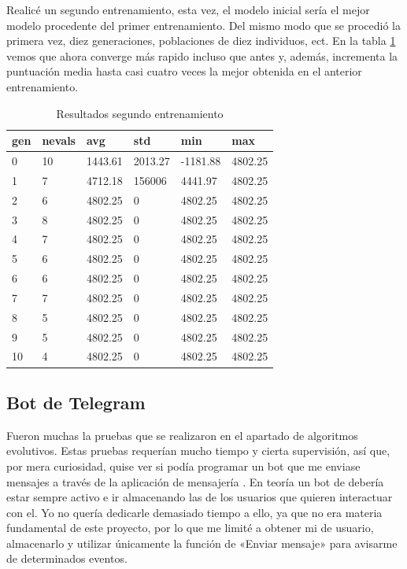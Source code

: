 Realicé un segundo entrenamiento, esta vez, el modelo inicial sería el mejor modelo procedente del primer entrenamiento. Del mismo modo que se procedió la primera vez, diez generaciones, poblaciones de diez individuos, ect. En la tabla \ref{result_segundo_entr} vemos que ahora converge más rapido incluso que antes y, además, incrementa la puntuación media hasta casi cuatro veces la mejor obtenida en el anterior entrenamiento.

\begin{table}[]
\centering
\begin{tabular}{|l|l|l|l|l|l|}
\hline
\rowcolor[HTML]{C0C0C0} 
gen & nevals & avg     & std     & min      & max     \\ \hline
0   & 10     & 1443.61 & 2013.27 & -1181.88 & 4802.25 \\ \hline
1   & 7      & 4712.18 & 156006  & 4441.97  & 4802.25 \\ \hline
2   & 6      & 4802.25 & 0       & 4802.25  & 4802.25 \\ \hline
3   & 8      & 4802.25 & 0       & 4802.25  & 4802.25 \\ \hline
4   & 7      & 4802.25 & 0       & 4802.25  & 4802.25 \\ \hline
5   & 6      & 4802.25 & 0       & 4802.25  & 4802.25 \\ \hline
6   & 6      & 4802.25 & 0       & 4802.25  & 4802.25 \\ \hline
7   & 7      & 4802.25 & 0       & 4802.25  & 4802.25 \\ \hline
8   & 5      & 4802.25 & 0       & 4802.25  & 4802.25 \\ \hline
9   & 5      & 4802.25 & 0       & 4802.25  & 4802.25 \\ \hline
10  & 4      & 4802.25 & 0       & 4802.25  & 4802.25 \\ \hline
\end{tabular}
\caption{Resultados segundo entrenamiento}
\label{result_segundo_entr}
\end{table}


\subsection{Bot de Telegram}
Fueron muchas la pruebas que se realizaron en el apartado de algoritmos evolutivos. Estas pruebas requerían mucho tiempo y cierta supervisión, así que, por mera curiosidad, quise ver si podía programar un bot que me enviase mensajes a través de la aplicación de mensajería . 
En teoría un bot de  debería estar sempre activo e ir almacenando las   de los usuarios que quieren interactuar con el. Yo no quería dedicarle demasiado tiempo a ello, ya que no era materia fundamental de este proyecto, por lo que me limité a obtener mi  de usuario, almacenarlo y utilizar únicamente la función de «Enviar mensaje» para avisarme de determinados eventos.


